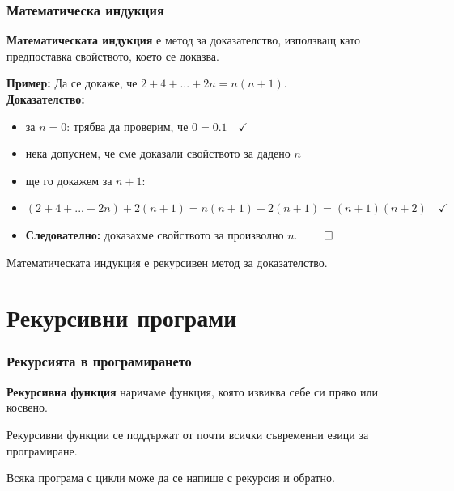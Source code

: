 \documentclass[alsotrans]{beamerswitch}
\begin{document}
\begin{frame}
  \frametitle{Математическа индукция}

  \begin{definition}
    \textbf{Математическата индукция} е метод за доказателство, използващ като предпоставка свойството, което се доказва.
  \end{definition}
  \pause
  \textbf{Пример:} Да се докаже, че $2 + 4 + ... + 2n = n(n+1)$.\\[1em]
  \pause
  \textbf{Доказателство:}
  \begin{itemize}[<+->]
  \item за $n = 0$: трябва да проверим, че $0 = 0.1\quad\checkmark$
  \item нека допуснем, че сме доказали свойството за дадено $n$
  \item ще го докажем за $n+1$:
  \item $(2 + 4 + ... + 2n) + 2(n+1) = n(n+1) + 2(n+1) = (n+1)(n+2)\quad\checkmark$
  \item \textbf{Следователно:} доказахме свойството за произволно $n$. $\qed$
  \end{itemize}
  \onslide<+->
  Математическата индукция е рекурсивен метод за доказателство.
\end{frame}

\section{Рекурсивни програми}

\begin{frame}
  \frametitle{Рекурсията в програмирането}

  \begin{definition}
    \textbf{Рекурсивна функция} наричаме функция, която извиква себе си пряко или косвено.
  \end{definition}
  \pause
  \vspace{2em}
  Рекурсивни функции се поддържат от почти всички съвременни езици за програмиране.\\[2em]
  \pause
  \begin{theorem}
    Всяка програма с цикли може да се напише с рекурсия и обратно.
  \end{theorem}
\end{frame}
\end{document}
